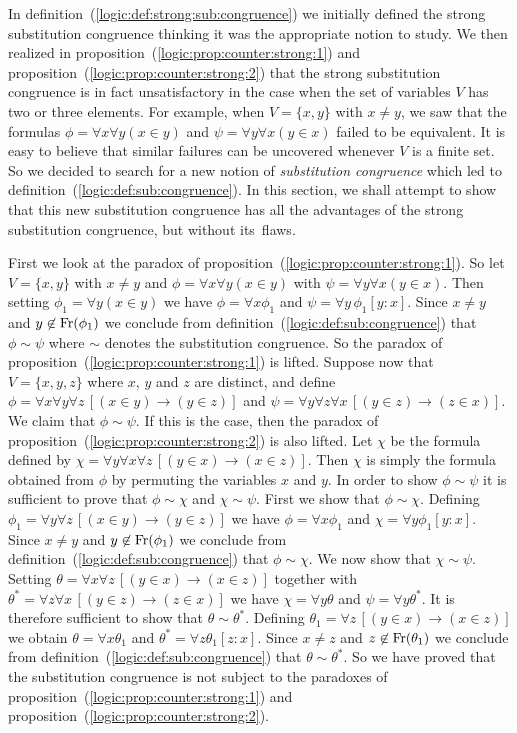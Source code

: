 In definition~(\ref{logic:def:strong:sub:congruence}) we initially
defined the strong substitution congruence thinking it was the
appropriate notion to study. We then realized in
proposition~(\ref{logic:prop:counter:strong:1}) and
proposition~(\ref{logic:prop:counter:strong:2}) that the strong
substitution congruence is in fact unsatisfactory in the case when
the set of variables $V$ has two or three elements. For example,
when $V=\{x,y\}$ with $x\neq y$, we saw that the formulas
$\phi=\forall x\forall y(x\in y)$ and $\psi=\forall y\forall x(y\in
x)$ failed to be equivalent. It is easy to believe that similar
failures can be uncovered whenever $V$ is a finite set. So we
decided to search for a new notion of {\em substitution congruence}
which led to definition~(\ref{logic:def:sub:congruence}). In this
section, we shall attempt to show that this new substitution
congruence has all the advantages of the strong substitution
congruence, but without its~flaws.

First we look at the paradox of
proposition~(\ref{logic:prop:counter:strong:1}). So let $V=\{x,y\}$
with $x\neq y$ and $\phi=\forall x\forall y(x\in y)$ with
$\psi=\forall y\forall x(y\in x)$. Then setting $\phi_{1}=\forall
y(x\in y)$ we have $\phi=\forall x\phi_{1}$ and $\psi=\forall
y\,\phi_{1}[y\!:\!x]$. Since $x\neq y$ and $y\not\in\mbox{\rm Fr}(\phi_{1})$
we conclude from definition~(\ref{logic:def:sub:congruence}) that
$\phi\sim\psi$ where $\sim$ denotes the substitution congruence. So
the paradox of proposition~(\ref{logic:prop:counter:strong:1}) is
lifted. Suppose now that $V=\{x,y,z\}$ where $x$, $y$ and $z$ are
distinct, and define $\phi= \forall x\forall y\forall z\,[(x\in
y)\to(y\in z)]$ and $\psi=\forall y\forall z\forall x\,[(y\in
z)\to(z\in x)]$. We claim that $\phi\sim\psi$. If this is the case,
then the paradox of proposition~(\ref{logic:prop:counter:strong:2})
is also lifted. Let $\chi$ be the formula defined by $\chi=\forall
y\forall x\forall z\,[(y\in x)\to(x\in z)]$. Then $\chi$ is simply
the formula obtained from $\phi$ by permuting the variables $x$ and
$y$. In order to show $\phi\sim\psi$ it is sufficient to prove that
$\phi\sim\chi$ and $\chi\sim\psi$. First we show that
$\phi\sim\chi$. Defining $\phi_{1}=\forall y\forall z\,[(x\in
y)\to(y\in z)]$ we have $\phi=\forall x\phi_{1}$ and $\chi=\forall
y\phi_{1}[y\!:\!x]$. Since $x\neq y$ and $y\not\in\mbox{\rm Fr}(\phi_{1})$
we conclude from definition~(\ref{logic:def:sub:congruence}) that
$\phi\sim\chi$. We now show that $\chi\sim\psi$. Setting
$\theta=\forall x\forall z\,[(y\in x)\to(x\in z)]$ together with
$\theta^{*}=\forall z\forall x\,[(y\in z)\to(z\in x)]$ we have
$\chi=\forall y\theta$ and $\psi=\forall y\theta^{*}$. It is
therefore sufficient to show that $\theta\sim\theta^{*}$. Defining
$\theta_{1}=\forall z\,[(y\in x)\to(x\in z)]$ we obtain
$\theta=\forall x\theta_{1}$ and $\theta^{*}=\forall
z\theta_{1}[z\!:\!x]$. Since $x\neq z$ and
$z\not\in\mbox{\rm Fr}(\theta_{1})$ we conclude from
definition~(\ref{logic:def:sub:congruence}) that
$\theta\sim\theta^{*}$. So we have proved that the substitution
congruence is not subject to the paradoxes of
proposition~(\ref{logic:prop:counter:strong:1}) and
proposition~(\ref{logic:prop:counter:strong:2}).


